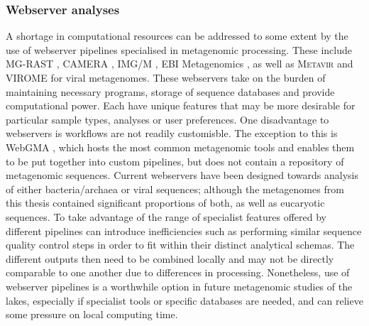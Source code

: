 \subsubsection{Webserver analyses}
A shortage in computational resources can be addressed to some extent by the use of webserver pipelines specialised in metagenomic processing.
These include \acs{MG-RAST} \cite{Meyer2008}, \acs{CAMERA} \cite{Sun2011}, \acs{IMG/M} \cite{Markowitz2008, Markowitz2012}, EBI Metagenomics \cite{Hunter2012}, as well as \textsc{Metavir} \cite{Roux2011} and \acs{VIROME} \cite{Wommack2012} for viral metagenomes.
These webservers take on the burden of maintaining necessary programs, storage of sequence databases and provide computational power.
Each have unique features that may be more desirable for particular sample types, analyses or user preferences.
One disadvantage to webservers is workflows are not readily customisble.
The exception to this is WebGMA \cite{Wu2011a}, which hosts the most common metagenomic tools and enables them to be put together into custom pipelines, but does not contain a repository of metagenomic sequences.
Current webservers have been designed towards analysis of either bacteria/archaea or viral sequences; although the metagenomes from this thesis contained significant proportions of both, as well as eucaryotic sequences.
To take advantage of the range of specialist features offered by different pipelines can introduce inefficiencies such as performing similar sequence quality control steps in order to fit within their distinct analytical schemas. 
The different outputs then need to be combined locally and may not be directly comparable to one another due to differences in processing.
Nonetheless, use of webserver pipelines is a worthwhile option in future metagenomic studies of the lakes, especially if specialist tools or specific databases are needed, and can relieve some pressure on local computing time.

